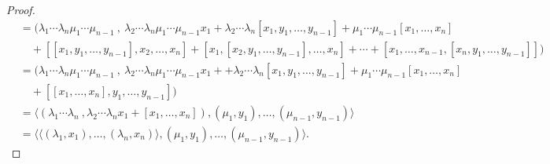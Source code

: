 \documentclass[a4paper,reqno,10pt]{amsart}
\theoremstyle{plain}
\theoremstyle{definition}
\theoremstyle{remark}
\begin{document}
\begin{proof}
\begin{align*}
         &= \big( \lambda_1 \cdots \lambda_n \mu_1 \cdots \mu_{n-1} ~ \! , ~ \! \lambda_2 \cdots \lambda_n \mu_1 \cdots \mu_{n-1} x_1 + \lambda_2 \cdots \lambda_n [x_1, y_1, \ldots, y_{n-1}] + \mu_1 \cdots \mu_{n-1} [x_1, \ldots, x_n] \\
         & \quad + [[x_1 , y_1, \ldots, y_{n-1}], x_2, \ldots, x_n] + [ x_1, [x_2, y_1, \ldots, y_{n-1}], \ldots, x_n] + \cdots + [x_1, \ldots, x_{n-1}, [x_n, y_1, \ldots, y_{n-1}]] \big) \\
         &= \big( \lambda_1 \cdots \lambda_n \mu_1 \cdots \mu_{n-1} ~ \! , ~ \! \lambda_2 \cdots \lambda_n \mu_1 \cdots \mu_{n-1} x_1 + + \lambda_2 \cdots \lambda_n [x_1, y_1, \ldots, y_{n-1}] + \mu_1 \cdots \mu_{n-1} [x_1, \ldots, x_n] \\ & \quad + [[ x_1, \ldots, x_n ], y_1, \ldots, y_{n-1} ] \big) \\
         &= \langle    (\lambda_1 \cdots \lambda_n ~ \! , \lambda_2 \cdots \lambda_n x_1 + [x_1, \ldots, x_n ]) ,  (\mu_1, y_1), \ldots, (\mu_{n-1}, y_{n-1}) \rangle \\
         &= \langle \langle (\lambda_1, x_1), \ldots , (\lambda_n , x_n) \rangle , (\mu_1, y_1), \ldots, (\mu_{n-1}, y_{n-1}) \rangle.
     \end{align*}

     \medskip


\end{proof}
\end{document}

